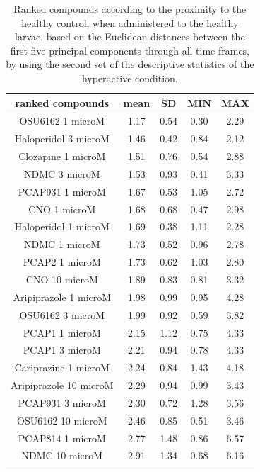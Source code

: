 \documentclass[a4paper,12pt]{article}
\begin{document}
\begin{table}[h!]\tiny
\centering
\caption{Ranked compounds according to the proximity to the healthy control, when administered to the healthy larvae, based on the Euclidean distances between the first five principal components through all time frames, by using the second set of the descriptive statistics of the hyperactive condition.}
\begin{tabular}{|c|c|c|c|c|}
\hline
ranked compounds             & mean & SD   & MIN  & MAX   \\ \hline
OSU6162 1 microM       & 1.17 & 0.54 & 0.30  & 2.29  \\ \hline
Haloperidol 3 microM   & 1.46 & 0.42 & 0.84 & 2.12  \\ \hline
Clozapine 1 microM     & 1.51 & 0.76 & 0.54 & 2.88  \\ \hline
NDMC 3 microM          & 1.53 & 0.93 & 0.41 & 3.33  \\ \hline
PCAP931 1 microM       & 1.67 & 0.53 & 1.05 & 2.72  \\ \hline
CNO 1 microM           & 1.68 & 0.68 & 0.47 & 2.98  \\ \hline
Haloperidol 1 microM   & 1.69 & 0.38 & 1.11 & 2.28  \\ \hline
NDMC 1 microM          & 1.73 & 0.52 & 0.96 & 2.78  \\ \hline
PCAP2 1 microM         & 1.73 & 0.62 & 1.03 & 2.80   \\ \hline
CNO 10 microM          & 1.89 & 0.83 & 0.81 & 3.32  \\ \hline
Aripiprazole 1 microM  & 1.98 & 0.99 & 0.95 & 4.28  \\ \hline
OSU6162 3 microM       & 1.99 & 0.92 & 0.59 & 3.82  \\ \hline
PCAP1 1 microM         & 2.15 & 1.12 & 0.75 & 4.33  \\ \hline
PCAP1 3 microM         & 2.21 & 0.94 & 0.78 & 4.33  \\ \hline
Cariprazine 1 microM   & 2.24 & 0.84 & 1.43 & 4.18  \\ \hline
Aripiprazole 10 microM & 2.29 & 0.94 & 0.99 & 3.43  \\ \hline
PCAP931 3 microM       & 2.30  & 0.72 & 1.28 & 3.56  \\ \hline
OSU6162 10 microM      & 2.46 & 0.85 & 0.51 & 3.46  \\ \hline
PCAP814 1 microM       & 2.77 & 1.48 & 0.86 & 6.57  \\ \hline
NDMC 10 microM         & 2.91 & 1.34 & 0.68 & 6.16  \\ \hline

\end{tabular}
\end{table}
\end{document}
